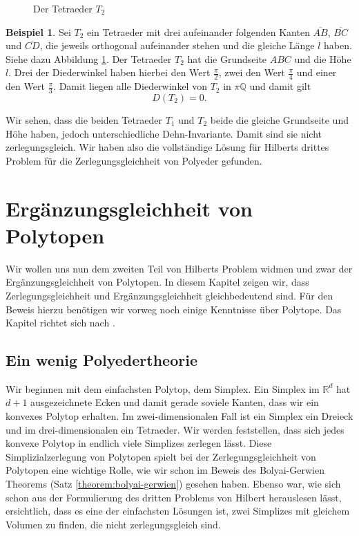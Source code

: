 \documentclass[11pt,titlepage]{article}
\newcommand{\setQ}{\mathbb{Q}}
\newcommand{\setR}{\mathbb{R}}
\theoremstyle{definition}
\newtheorem{example}[theorem]{Beispiel}
\theoremstyle{remark}
\begin{document}
\begin{figure}[!htbp]
\begin{minipage}[m]{0.4\textwidth}
			\caption{Der Tetraeder $T_2$}
			\label{Abb.6}
		\end{minipage}
	\end{figure}

	\begin{example}
		Sei $T_2$ ein Tetraeder mit drei aufeinander folgenden Kanten 
		$\overline{AB}$, $\overline{BC}$ und $\overline{CD}$, die jeweils 
		orthogonal aufeinander stehen und die gleiche Länge $l$ haben. 
		Siehe dazu Abbildung \ref{Abb.6}. 
		Der Tetraeder $T_2$ hat die Grundseite $ABC$ und die Höhe $l$. 
		Drei der Diederwinkel haben hierbei den Wert $\frac{\pi}{2}$, 
		zwei den Wert $\frac{\pi}{4}$ und einer den Wert $\frac{\pi}{3}$. 
		Damit liegen alle Diederwinkel von $T_2$ in $\pi\setQ$ und damit 
		gilt 
		\[D(T_2)=0.\]
	\end{example}
	
	Wir sehen, dass die beiden Tetraeder $T_1$ und $T_2$ beide die 
	gleiche Grundseite und Höhe haben, jedoch unterschiedliche Dehn-Invariante. 
	Damit sind sie nicht zerlegungsgleich. Wir haben also die vollständige 
	Lösung für Hilberts drittes Problem für die Zerlegungsgleichheit von 
	Polyeder gefunden.
	
	\newpage
	
	\section{Ergänzungsgleichheit von Polytopen}
	
	Wir wollen uns nun dem zweiten Teil von Hilberts Problem widmen und zwar der 
	Ergänzungsgleichheit von Polytopen. In diesem Kapitel zeigen wir, dass 
	Zerlegungsgleichheit und Ergänzungsgleichheit gleichbedeutend sind. Für den 
	Beweis hierzu benötigen wir vorweg noch einige Kenntnisse über Polytope. Das Kapitel richtet sich nach 
	\cite{Hadwiger}. 
	
	\subsection{Ein wenig Polyedertheorie}
	
	Wir beginnen mit dem einfachsten Polytop, dem Simplex. Ein Simplex 
	im $\setR^d$ hat 
	$d+1$ ausgezeichnete Ecken und damit gerade soviele Kanten, dass 
	wir ein konvexes Polytop erhalten. Im zwei-dimensionalen Fall ist ein 
	Simplex ein Dreieck und im drei-dimensionalen ein Tetraeder. Wir werden 
	feststellen, dass sich jedes konvexe Polytop in endlich viele Simplizes 
	zerlegen lässt. Diese Simplizialzerlegung von Polytopen spielt bei 
	der Zerlegungsgleichheit von Polytopen eine wichtige Rolle, wie wir schon im 
	Beweis des Bolyai-Gerwien Theorems (Satz \ref{theorem:bolyai-gerwien}) 
	gesehen haben. Ebenso war, wie sich schon aus der Formulierung des dritten Problems von Hilbert herauslesen lässt, ersichtlich, dass es eine der einfachsten Lösungen ist, zwei Simplizes mit gleichem Volumen zu finden, die nicht zerlegungsgleich sind.
	
\end{document}
